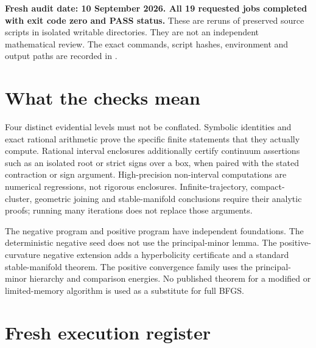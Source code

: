 \textbf{Fresh audit date: 10 September 2026. All 19 requested jobs completed with exit code zero and PASS status.} These are reruns of preserved source scripts in isolated writable directories. They are not an independent mathematical review. The exact commands, script hashes, environment and output paths are recorded in .

\section{What the checks mean}\label{what-the-checks-mean}

Four distinct evidential levels must not be conflated. Symbolic identities and exact rational arithmetic prove the specific finite statements that they actually compute. Rational interval enclosures additionally certify continuum assertions such as an isolated root or strict signs over a box, when paired with the stated contraction or sign argument. High-precision non-interval computations are numerical regressions, not rigorous enclosures. Infinite-trajectory, compact-cluster, geometric joining and stable-manifold conclusions require their analytic proofs; running many iterations does not replace those arguments.

The negative program and positive program have independent foundations. The deterministic negative seed does not use the principal-minor lemma. The positive-curvature negative extension adds a hyperbolicity certificate and a standard stable-manifold theorem. The positive convergence family uses the principal-minor hierarchy and comparison energies. No published theorem for a modified or limited-memory algorithm is used as a substitute for full BFGS.

\section{Fresh execution register}\label{fresh-execution-register}

